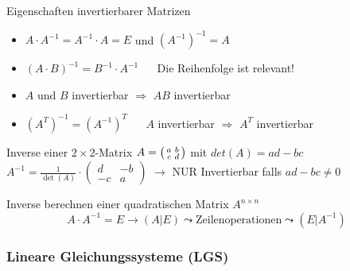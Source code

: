     \begin{theorem}{Eigenschaften invertierbarer Matrizen}
        \begin{itemize}
            \item $A\cdot A^{-1}=A^{-1}\cdot A=E$ und $(A^{-1})^{-1}=A$
            \item ${(A\cdot B)}^{-1}=B^{-1}\cdot A^{-1}$ {\small $\quad$ Die Reihenfolge ist relevant!}
            \item $A$ und $B$ invertierbar $\Rightarrow$ $AB$ invertierbar
            \item ${(A^T)^{-1}}={(A^{-1})}^T$ $\quad$ $A$ invertierbar $\Rightarrow$ $A^T$ invertierbar
        \end{itemize}
    \end{theorem}

\begin{theorem}{Inverse einer $2 \times 2$-Matrix} $A = \begin{psmallmatrix} a & b \\ c & d \end{psmallmatrix}$ mit $det(A) = ad - bc$\\
        $A^{-1} = \frac{1}{\det(A)} \cdot \begin{pmatrix} d & -b \\ -c & a \end{pmatrix}$
        $\rightarrow$ NUR Invertierbar falls $ad - bc \neq 0$
\end{theorem}

\begin{KR}{Inverse berechnen} einer quadratischen Matrix $A^{n \times n}$
    $$A \cdot A^{-1} = E \rightarrow ( A | E ) \leadsto \text{Zeilenoperationen} \leadsto ( E | A^{-1})$$
\end{KR}

\raggedcolumns
\columnbreak

\subsubsection*{Lineare Gleichungssysteme (LGS)}
    
